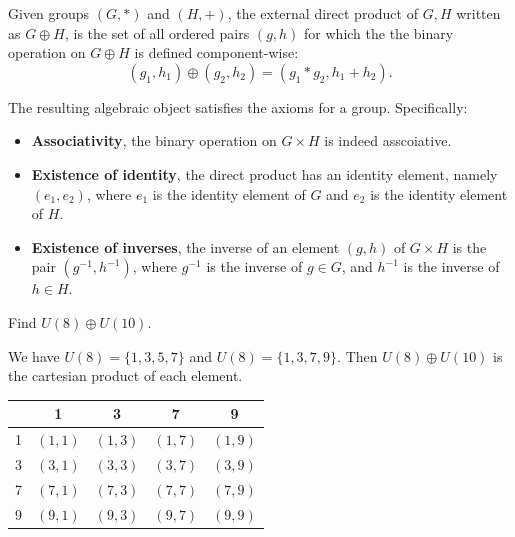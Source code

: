 \begin{definition}
    Given groups $(G, *)$ and $(H, +)$, the external direct product of 
    $G, H$ written as $G \oplus H$, is the set of all ordered pairs $(g,h)$ for which the 
    the binary operation on $G \oplus H$ is defined component-wise:
    \[
        (g_1, h_1) \oplus (g_2, h_2) = (g_1 * g_2, h_1 + h_2).
    \]
\end{definition}

The resulting algebraic object satisfies the axioms for a group. Specifically:

\begin{itemize}
    \item \textbf{Associativity}, the binary operation on $G \times H$ is indeed asscoiative.
    \item \textbf{Existence of identity}, the direct product has an identity element, namely $(e_1, e_2)$, where 
        $e_1$ is the identity element of $G$ and $e_2$ is the identity element of $H$.
    \item \textbf{Existence of inverses}, the inverse of an element $(g,h)$ of $G \times H$ is the pair $(g^{-1}, h^{-1})$, 
        where $g^{-1}$ is the inverse of $g \in G$, and $h^{-1}$ is the inverse of $h \in H$.
\end{itemize}

\begin{example}
    Find $U(8) \oplus U(10)$.
\end{example}
\begin{solution}
    We have $U(8) = \{1,3,5,7\}$ and $U(8) = \{1,3,7,9\}$. Then $U(8) \oplus U(10)$ is the cartesian
    product of each element.

    \begin{center}
        \begin{tabular}{c|cccc}
            & 1 & 3 & 7 & 9\\
            \hline
            1 & $(1,1)$ & $(1,3)$ & $(1,7)$ & $(1,9)$\\
            3 & $(3,1)$ & $(3,3)$ & $(3,7)$ & $(3,9)$\\
            7 & $(7,1)$ & $(7,3)$ & $(7,7)$ & $(7,9)$\\
            9 & $(9,1)$ & $(9,3)$ & $(9,7)$ & $(9,9)$\\
        \end{tabular}
    \end{center}
\end{solution}

